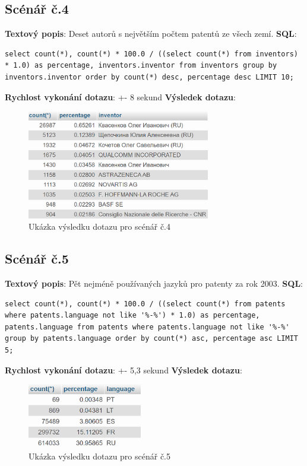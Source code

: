 \subsection{Scénář č.4} 
\textbf{Textový popis}: Deset autorů s největším počtem patentů ze všech zemí.
\newline
\textbf{SQL}: 
\begin{lstlisting}[label = {lst:elements_a}]
select count(*), count(*) * 100.0 / ((select count(*) from inventors) * 1.0) as percentage, inventors.inventor from inventors group by inventors.inventor order by count(*) desc, percentage desc LIMIT 10;
\end{lstlisting}
\textbf{Rychlost vykonání dotazu}: +- 8 sekund
\newline
\textbf{Výsledek dotazu}:
\begin{figure}[H]
\centering
\includegraphics[width=8cm]{img/scenare/scenar_4}
\caption{Ukázka výsledku dotazu pro scénář č.4}
\label{fig:scenar4}
\end{figure}

\subsection{Scénář č.5}
\textbf{Textový popis}: Pět nejméně používaných jazyků pro patenty za rok 2003.
\newline
\textbf{SQL}: 
\begin{lstlisting}[label = {lst:elements_a}]
select count(*), count(*) * 100.0 / ((select count(*) from patents where patents.language not like '%-%') * 1.0) as percentage, patents.language from patents where patents.language not like '%-%' group by patents.language order by count(*) asc, percentage asc LIMIT 5;
\end{lstlisting}
\textbf{Rychlost vykonání dotazu}: +- 5,3 sekund
\newline
\textbf{Výsledek dotazu}:
\begin{figure}[H]
\centering
\includegraphics[width=5cm]{img/scenare/scenar_5}
\caption{Ukázka výsledku dotazu pro scénář č.5}
\label{fig:scenar5}
\end{figure}

